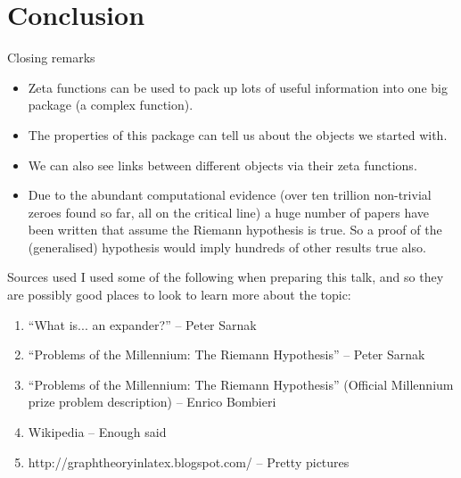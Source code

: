 \documentclass{beamer}
\begin{document}
\section{Conclusion}
\begin{frame}{Closing remarks}
\begin{itemize}
\item Zeta functions can be used to pack up lots of useful information into one big package (a complex function).
\pause\item The properties of this package can tell us about the objects we started with.
\pause\item We can also see links between different objects via their zeta functions.
\pause\item Due to the abundant computational evidence (over ten trillion non-trivial zeroes found so far, all on the critical line) a huge number of papers have been written that assume the Riemann hypothesis is true.
So a proof of the (generalised) hypothesis would imply hundreds of other results true also.
\end{itemize}
\end{frame}

\begin{frame}{Sources used}
I used some of the following when preparing this talk, and so they are possibly good places to look to learn more about the topic:
\begin{enumerate}
\item ``What is... an expander?'' -- Peter Sarnak
\item ``Problems of the Millennium: The Riemann Hypothesis'' -- Peter Sarnak
\item ``Problems of the Millennium: The Riemann Hypothesis'' (Official Millennium prize problem description) -- Enrico Bombieri
\item Wikipedia -- Enough said
\item http://graphtheoryinlatex.blogspot.com/ -- Pretty pictures
\end{enumerate}
\end{frame}
\end{document}
